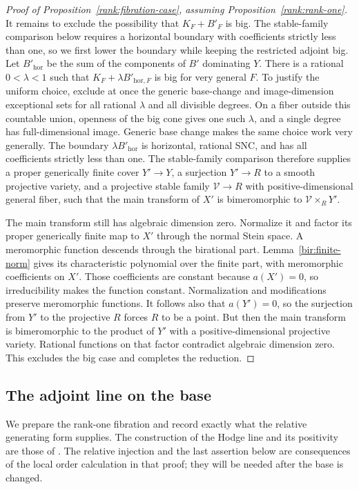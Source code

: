\begin{proof}[Proof of Proposition~\ref{rank:fibration-case},
assuming Proposition~\ref{rank:rank-one}]
It remains to exclude the possibility that \(K_F+B'_F\) is big.
The stable-family comparison below requires a horizontal boundary with
coefficients strictly less than one, so we first lower the boundary while
keeping the restricted adjoint big.
Let \(B'_{\mathrm{hor}}\) be the sum of the components of \(B'\)
dominating \(Y\).  There is a rational \(0<\lambda<1\) such that
\(K_F+\lambda B'_{\mathrm{hor},F}\) is big for very general \(F\).
To justify the uniform choice, exclude at once the generic base-change
and image-dimension exceptional sets for all rational \(\lambda\)
and all divisible degrees.  On a fiber outside this countable union,
openness of the big cone gives one such \(\lambda\), and a single
degree has full-dimensional image.  Generic base change makes the
same choice work very generally.  The boundary
\(\lambda B'_{\mathrm{hor}}\) is horizontal, rational SNC, and has
all coefficients strictly less than one.  The stable-family
comparison \cite[Lemma~5.2]{CI} therefore supplies a proper
generically finite cover \(Y'\to Y\), a surjection \(Y'\to R\) to a
smooth projective variety, and a projective stable family
\(\mathcal V\to R\) with positive-dimensional general fiber, such
that the main transform of \(X'\) is bimeromorphic to
\(\mathcal V\times_RY'\).

The main transform still has algebraic dimension zero.  Normalize it and
factor its proper generically finite map to \(X'\) through the normal Stein
space.  A meromorphic function descends through the birational part.
Lemma~\ref{bir:finite-norm} gives its characteristic polynomial over the
finite part, with meromorphic coefficients on \(X'\).  Those coefficients
are constant because \(a(X')=0\), so irreducibility makes the function
constant.  Normalization and modifications preserve meromorphic functions.
It follows also that \(a(Y')=0\), so the surjection from \(Y'\) to
the projective \(R\) forces \(R\) to be a point.  But then the main
transform is bimeromorphic to the product of \(Y'\) with a
positive-dimensional projective variety.  Rational functions on that
factor contradict algebraic dimension zero.  This excludes the big
case and completes the reduction.
\end{proof}

\subsection{The adjoint line on the base}

We prepare the rank-one fibration and record exactly what the relative
generating form supplies.  The construction of the Hodge line and its
positivity are those of \cite[Proposition~2.7 and Theorem~3.1]{CI}.
The relative injection and the last assertion below are consequences of
the local order calculation in that proof; they will be needed after
the base is changed.

